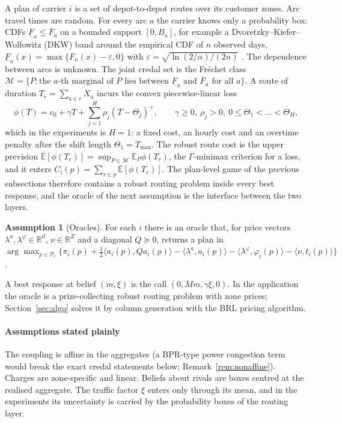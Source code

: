\documentclass[preprint,12pt]{elsarticle}
\theoremstyle{definition}
\newtheorem{assumption}{Assumption}
\theoremstyle{remark}
\newcommand{\R}{\mathbb{R}}
\newcommand{\E}{\mathbb{E}}
\newcommand{\cP}{\mathcal{P}}
\newcommand{\cM}{\mathcal{M}}
\newcommand{\Eu}{\overline{\mathbb{E}}}
\newcommand{\Fl}{\underline{F}}
\newcommand{\Fu}{\overline{F}}
\newcommand{\pos}[1]{\left(#1\right)^{+}}
\newcommand{\ip}[2]{\langle #1,#2\rangle}
\begin{document}
A plan of carrier $i$ is a set of depot-to-depot routes over its customer zones. Arc travel times are random. For every arc $a$ the carrier knows only a probability box: CDFs $\Fl_a\le\Fu_a$ on a bounded support $[0,B_a]$, for example a Dvoretzky--Kiefer--Wolfowitz (DKW) band around the empirical CDF of $n$ observed days, $\Fl_a(x)=\max\{F_n(x)-\varepsilon,0\}$ with $\varepsilon=\sqrt{\ln(2/\alpha)/(2n)}$ \citep{DKW1956,Massart1990}. The dependence between arcs is unknown. The joint credal set is the Fr\'echet class $\cM=\{P:\text{the $a$-th marginal of $P$ lies between }\Fl_a\text{ and }\Fu_a\text{ for all }a\}$. A route of duration $T_r=\sum_{a\in r}X_a$ incurs the convex piecewise-linear loss
\begin{equation}\label{eq:loss}
\phi(T)=c_0+\gamma T+\textstyle\sum_{j=1}^{H}\rho_j\pos{T-\Theta_j},\qquad \gamma\ge0,\ \rho_j>0,\ 0\le\Theta_1<\dots<\Theta_H,
\end{equation}
which in the experiments is $H=1$: a fixed cost, an hourly cost and an overtime penalty after the shift length $\Theta_1=T_{\max}$. The robust route cost is the upper prevision $\Eu[\phi(T_r)]=\sup_{P\in\cM}\E_P\phi(T_r)$, the $\Gamma$-minimax criterion for a loss, and it enters $C_i(p)=\sum_{r\in p}\Eu[\phi(T_r)]$. The plan-level game of the previous subsections therefore contains a robust routing problem inside every best response, and the oracle of the next assumption is the interface between the two layers.

\begin{assumption}[Oracles]\label{ass:oracle}
For each $i$ there is an oracle that, for price vectors $\lambda^a,\lambda^\varphi\in\R^d$, $\nu\in\R^Z$ and a diagonal $Q\succeq0$, returns a plan in $\arg\max_{p\in\cP_i}\{\pi_i(p)+\tfrac12\ip{a_i(p)}{Qa_i(p)}-\ip{\lambda^a}{a_i(p)}-\ip{\lambda^\varphi}{\varphi_i(p)}-\ip{\nu}{t_i(p)}\}$.
\end{assumption}

A best response at belief $(m,\xi)$ is the call $(0,Mm,\gamma\xi,0)$. In the application the oracle is a prize-collecting robust routing problem with zone prices; Section~\ref{sec:algo} solves it by column generation with the BRL pricing algorithm.

\paragraph{Assumptions stated plainly} The coupling is affine in the aggregates (a BPR-type power congestion term would break the exact credal statements below; Remark~\ref{rem:nonaffine}). Charges are zone-specific and linear. Beliefs about rivals are boxes centred at the realised aggregate. The traffic factor $\xi$ enters only through its mean, and in the experiments its uncertainty is carried by the probability boxes of the routing layer.
\end{document}
